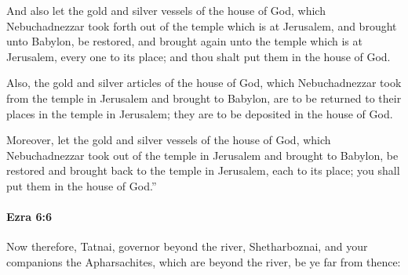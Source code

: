 			\begin{versebox}
					\item[BHS] 
					\item[LXX] 
					\item[ASV] And also let the gold and silver vessels of the house of God, which Nebuchadnezzar took forth out of the temple which is at Jerusalem, and brought unto Babylon, be restored, and brought again unto the temple which is at Jerusalem, every one to its place; and thou shalt put them in the house of God.
					\item[NIV] Also, the gold and silver articles of the house of God, which Nebuchadnezzar took from the temple in Jerusalem and brought to Babylon, are to be returned to their places in the temple in Jerusalem; they are to be deposited in the house of God.
					\item[NRSV] Moreover, let the gold and silver vessels of the house of God, which Nebuchadnezzar took out of the temple in Jerusalem and brought to Babylon, be restored and brought back to the temple in Jerusalem, each to its place; you shall put them in the house of God.”
			\end{versebox}

		\paragraph{Ezra 6:6} %
			\label{EZRA-6-6}

			Now therefore, Tatnai, governor beyond the river, Shetharboznai, and your companions the Apharsachites, which are beyond the river, be ye far from thence:

